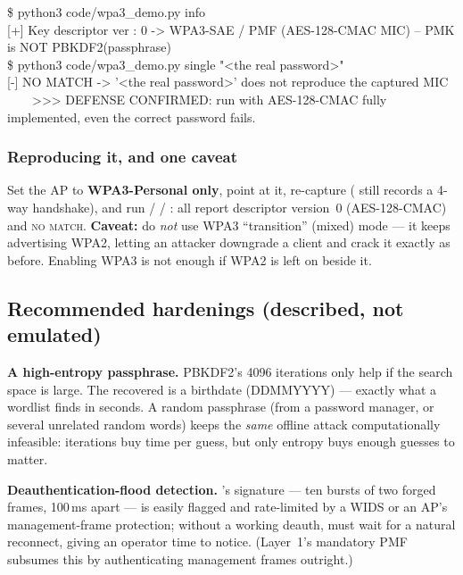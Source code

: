 \begin{console}
{}\$ python3 code/wpa3\_demo.py info\\
{}[+] Key descriptor ver  : 0  ->  WPA3-SAE / PMF (AES-128-CMAC MIC) -- PMK is NOT PBKDF2(passphrase)\\
{}\$ python3 code/wpa3\_demo.py single "<the real password>"\\
{}[-] NO MATCH -> '<the real password>' does not reproduce the captured MIC\\
{}\ \ \ \ >>> DEFENSE CONFIRMED: run with AES-128-CMAC fully implemented, even the correct password fails.
\end{console}

\subsubsection{Reproducing it, and one caveat}
Set the AP to \textbf{WPA3-Personal only}, point  at it, re-capture ( still records a 4-way handshake), and run   /  / : all report descriptor version~0 (AES-128-CMAC) and \textsc{no match}. \textbf{Caveat:} do \emph{not} use WPA3 ``transition'' (mixed) mode --- it keeps advertising WPA2, letting an attacker downgrade a client and crack it exactly as before. Enabling WPA3 is not enough if WPA2 is left on beside it.

\subsection{Recommended hardenings (described, not emulated)}
\textbf{A high-entropy passphrase.} PBKDF2's 4096 iterations only help if the search space is large. The recovered  is a birthdate (DDMMYYYY) --- exactly what a wordlist finds in seconds. A random passphrase (from a password manager, or several unrelated random words) keeps the \emph{same} offline attack computationally infeasible: iterations buy time per guess, but only entropy buys enough guesses to matter.

\smallskip
\noindent\textbf{Deauthentication-flood detection.} 's signature --- ten bursts of two forged frames, 100\,ms apart --- is easily flagged and rate-limited by a WIDS or an AP's management-frame protection; without a working deauth,  must wait for a natural reconnect, giving an operator time to notice. (Layer~1's mandatory PMF subsumes this by authenticating management frames outright.)


